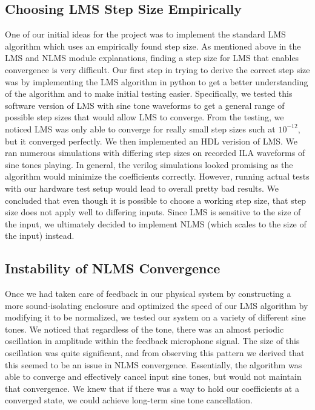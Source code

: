 \documentclass{fpgairpods}
\begin{document}
\subsection{Choosing LMS Step Size Empirically}
One of our initial ideas for the project was to implement the standard LMS algorithm which uses an empirically found step size. As mentioned above in the LMS and NLMS module explanations, finding a step size for LMS that enables convergence is very difficult. Our first step in trying to derive the correct step size was by implementing the LMS algorithm in python to get a better understanding of the algorithm and to make initial testing easier. Specifically, we tested this software version of LMS with sine tone waveforms to get a general range of possible step sizes that would allow LMS to converge. From the testing, we noticed LMS was only able to converge for really small step sizes such at $10^{-12}$, but it converged perfectly. We then implemented an HDL verision of LMS. We ran numerous simulations with differing step sizes on recorded ILA waveforms of sine tones playing. In general, the verilog simulations looked promising as the algorithm would minimize the coefficients correctly. However, running actual tests with our hardware test setup would lead to overall pretty bad results. We concluded that even though it is possible to choose a working step size, that step size does not apply well to differing inputs. Since LMS is sensitive to the size of the input, we ultimately decided to implement NLMS (which scales to the size of the input) instead.


\subsection{Instability of NLMS Convergence}
Once we had taken care of feedback in our physical system by constructing a more sound-isolating enclosure and optimized the speed of our LMS algorithm by modifying it to be normalized, we tested our system on a variety of different sine tones. We noticed that regardless of the tone, there was an almost periodic oscillation in amplitude within the feedback microphone signal. The size of this oscillation was quite significant, and from observing this pattern we derived that this seemed to be an issue in NLMS convergence. Essentially, the algorithm was able to converge and effectively cancel input sine tones, but would not maintain that convergence. We knew that if there was a way to hold our coefficients at a converged state, we could achieve long-term sine tone cancellation.
\end{document}
